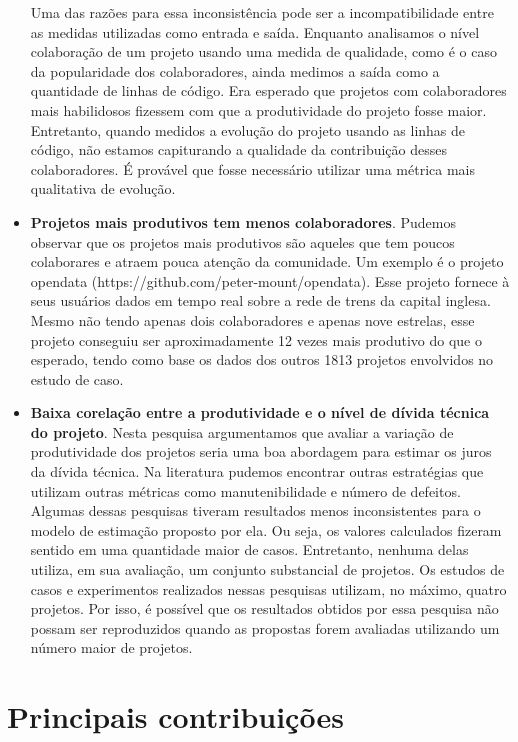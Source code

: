 \begin{itemize}
Uma das razões para essa inconsistência pode ser a incompatibilidade entre as medidas utilizadas como entrada e saída. Enquanto analisamos o nível colaboração de um projeto usando uma medida de qualidade, como é o caso da popularidade dos colaboradores, ainda medimos a saída como a quantidade de linhas de código. Era esperado que projetos com colaboradores mais habilidosos fizessem com que a produtividade do projeto fosse maior. Entretanto, quando medidos a evolução do projeto usando as linhas de código, não estamos capiturando a qualidade da contribuição desses colaboradores. É provável que fosse necessário utilizar uma métrica mais qualitativa de evolução.
\item \textbf{Projetos mais produtivos tem menos colaboradores}. Pudemos observar que os projetos mais produtivos são aqueles que tem poucos colaborares e atraem pouca atenção da comunidade. Um exemplo é o projeto opendata (https://github.com/peter-mount/opendata). Esse projeto fornece à seus usuários dados em tempo real sobre a rede de trens da capital inglesa. Mesmo não tendo apenas dois colaboradores e apenas nove estrelas, esse projeto conseguiu ser aproximadamente 12 vezes mais produtivo do que o esperado, tendo como base os dados dos outros 1813 projetos envolvidos no estudo de caso.
\item \textbf{Baixa corelação entre a produtividade e o nível de dívida técnica do projeto}. Nesta pesquisa argumentamos que avaliar a variação de produtividade dos projetos seria uma boa abordagem para estimar os juros da dívida técnica. Na literatura pudemos encontrar outras estratégias que utilizam outras métricas como manutenibilidade e número de defeitos. Algumas dessas pesquisas tiveram resultados menos inconsistentes para o modelo de estimação proposto por ela. Ou seja, os valores calculados fizeram sentido em uma quantidade maior de casos. Entretanto, nenhuma delas utiliza, em sua avaliação, um conjunto substancial de projetos.  Os estudos de casos e experimentos realizados nessas pesquisas utilizam, no máximo, quatro projetos. Por isso, é possível que os resultados obtidos por essa pesquisa não possam ser reproduzidos quando as propostas forem avaliadas utilizando um número maior de projetos.

\end{itemize}





\section{Principais contribuições}

